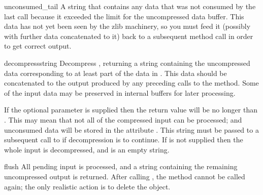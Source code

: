 \begin{memberdesc}{unconsumed_tail}
A string that contains any data that was not consumed by the last
 call because it exceeded the limit for the
uncompressed data buffer.  This data has not yet been seen by the zlib
machinery, so you must feed it (possibly with further data
concatenated to it) back to a subsequent  method
call in order to get correct output.
\end{memberdesc}


\begin{methoddesc}[Decompress]{decompress}{string}{}
Decompress , returning a string containing the
uncompressed data corresponding to at least part of the data in
.  This data should be concatenated to the output produced
by any preceding calls to the
 method.  Some of the input data may be preserved
in internal buffers for later processing.

If the optional parameter  is supplied then the return value
will be no longer than . This may mean that not all of the
compressed input can be processed; and unconsumed data will be stored
in the attribute . This string must be passed
to a subsequent call to  if decompression is to
continue.  If  is not supplied then the whole input is
decompressed, and  is an empty string.
\end{methoddesc}

\begin{methoddesc}[Decompress]{flush}{}
All pending input is processed, and a string containing the remaining
uncompressed output is returned.  After calling , the
 method cannot be called again; the only realistic
action is to delete the object.
\end{methoddesc}

\begin{seealso}
\end{seealso}
